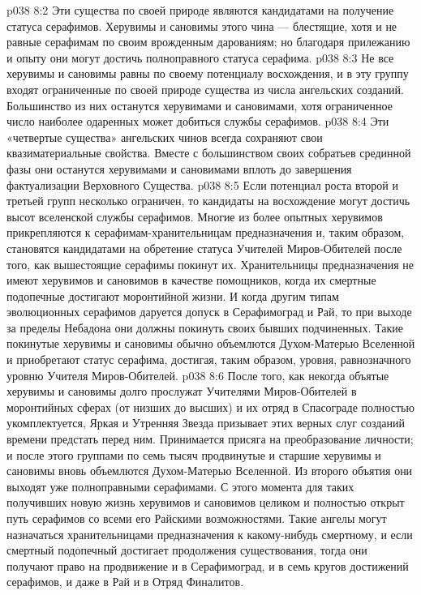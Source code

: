 \vs p038 8:2 \pc {}\bibnobreakspace {} Эти существа по своей природе являются кандидатами на получение статуса серафимов. Херувимы и сановимы этого чина --- блестящие, хотя и не равные серафимам по своим врожденным дарованиям; но благодаря прилежанию и опыту они могут достичь полноправного статуса серафима.
\vs p038 8:3 \pc {}\bibnobreakspace {} Не все херувимы и сановимы равны по своему потенциалу восхождения, и в эту группу входят ограниченные по своей природе существа из числа ангельских созданий. Большинство из них останутся херувимами и сановимами, хотя ограниченное число наиболее одаренных может добиться службы серафимов.
\vs p038 8:4 \pc {}\bibnobreakspace {} Эти «четвертые существа» ангельских чинов всегда сохраняют свои квазиматериальные свойства. Вместе с большинством своих собратьев срединной фазы они останутся херувимами и сановимами вплоть до завершения фактуализации Верховного Существа.
\vs p038 8:5 \pc Если потенциал роста второй и третьей групп несколько ограничен, то кандидаты на восхождение могут достичь высот вселенской службы серафимов. Многие из более опытных херувимов прикрепляются к серафимам\hyp{}хранительницам предназначения и, таким образом, становятся кандидатами на обретение статуса Учителей Миров\hyp{}Обителей после того, как вышестоящие серафимы покинут их. Хранительницы предназначения не имеют херувимов и сановимов в качестве помощников, когда их смертные подопечные достигают моронтийной жизни. И когда другим типам эволюционных серафимов даруется допуск в Серафимоград и Рай, то при выходе за пределы Небадона они должны покинуть своих бывших подчиненных. Такие покинутые херувимы и сановимы обычно объемлются Духом\hyp{}Матерью Вселенной и приобретают статус серафима, достигая, таким образом, уровня, равнозначного уровню Учителя Миров\hyp{}Обителей.
\vs p038 8:6 После того, как некогда объятые херувимы и сановимы долго прослужат Учителями Миров\hyp{}Обителей в моронтийных сферах (от низших до высших) и их отряд в Спасограде полностью укомплектуется, Яркая и Утренняя Звезда призывает этих верных слуг созданий времени предстать перед ним. Принимается присяга на преобразование личности; и после этого группами по семь тысяч продвинутые и старшие херувимы и сановимы вновь объемлются Духом\hyp{}Матерью Вселенной. Из второго объятия они выходят уже полноправными серафимами. С этого момента для таких получивших новую жизнь херувимов и сановимов целиком и полностью открыт путь серафимов со всеми его Райскими возможностями. Такие ангелы могут назначаться хранительницами предназначения к какому\hyp{}нибудь смертному, и если смертный подопечный достигает продолжения существования, тогда они получают право на продвижение и в Серафимоград, и в семь кругов достижений серафимов, и даже в Рай и в Отряд Финалитов.
